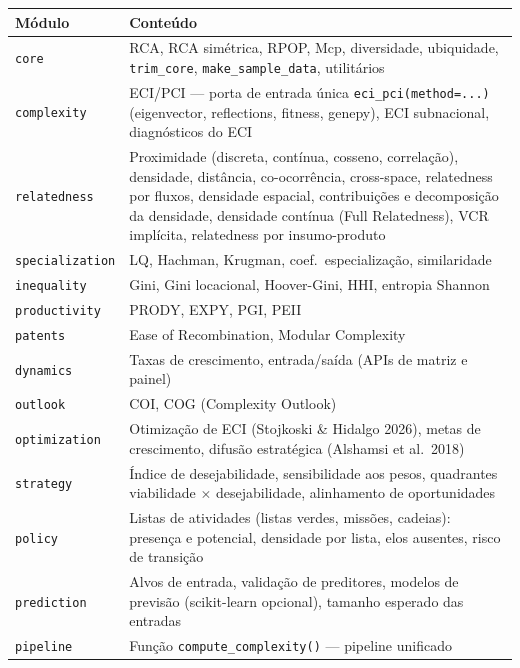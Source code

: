 \documentclass[12pt, a4paper]{article}
\begin{document}
\begin{center}
\begin{tabular}{l>{\raggedright\arraybackslash}p{10cm}}
\toprule
\textbf{M\'{o}dulo} & \textbf{Conte\'{u}do} \\
\midrule
\texttt{core}           & RCA, RCA sim\'{e}trica, RPOP, Mcp, diversidade, ubiquidade, \texttt{trim\_core},
                          \texttt{make\_sample\_data}, utilit\'{a}rios \\
\texttt{complexity}     & ECI/PCI --- porta de entrada \'{u}nica \texttt{eci\_pci(method=...)}
                          (eigenvector, reflections, fitness, genepy), ECI subnacional, diagn\'{o}sticos do ECI \\
\texttt{relatedness}    & Proximidade (discreta, cont\'{i}nua, cosseno, correla\c{c}\~{a}o),
                          densidade, dist\^{a}ncia, co-ocorr\^{e}ncia, cross-space,
                          relatedness por fluxos, densidade espacial,
                          contribui\c{c}\~{o}es e decomposi\c{c}\~{a}o da densidade, densidade cont\'{i}nua (Full Relatedness), VCR impl\'{i}cita, relatedness por insumo-produto \\
\texttt{specialization} & LQ, Hachman, Krugman, coef.\ especializa\c{c}\~{a}o, similaridade \\
\texttt{inequality}     & Gini, Gini locacional, Hoover-Gini, HHI, entropia Shannon \\
\texttt{productivity}   & PRODY, EXPY, PGI, PEII \\
\texttt{patents}        & Ease of Recombination, Modular Complexity \\
\texttt{dynamics}       & Taxas de crescimento, entrada/sa\'{i}da (APIs de matriz e painel) \\
\texttt{outlook}        & COI, COG (Complexity Outlook) \\
\texttt{optimization}   & Otimiza\c{c}\~{a}o de ECI (Stojkoski \& Hidalgo 2026), metas de
                          crescimento, difus\~{a}o estrat\'{e}gica (Alshamsi et al.\ 2018) \\
\texttt{strategy}       & \'{I}ndice de desejabilidade, sensibilidade aos pesos,
                          quadrantes viabilidade $\times$ desejabilidade, alinhamento de oportunidades \\
\texttt{policy}         & Listas de atividades (listas verdes, miss\~{o}es, cadeias):
                          presen\c{c}a e potencial, densidade por lista, elos ausentes, risco de transi\c{c}\~{a}o \\
\texttt{prediction}     & Alvos de entrada, valida\c{c}\~{a}o de preditores, modelos de
                          previs\~{a}o (scikit-learn opcional), tamanho esperado das entradas \\
\texttt{pipeline}       & Fun\c{c}\~{a}o \texttt{compute\_complexity()} --- pipeline unificado \\
\bottomrule
\end{tabular}
\end{center}
\end{document}
